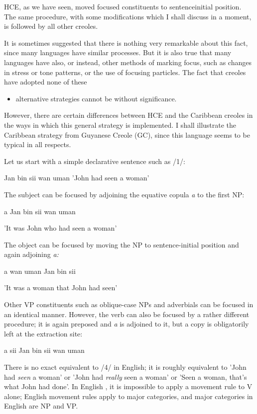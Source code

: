 HCE, as we have seen, moved focused constituents to sentence\-initial position. The same procedure, with some modifications which I shall discuss in a moment, is followed by all other creoles.

It is sometimes suggested that there is nothing very remarkable about this fact, since many languages have similar processes. But it is also true that many languages have also, or instead, other methods of marking focus, such as changes in stress or tone patterns, or the use of focusing particles. The fact that creoles have adopted none of these

\begin{itemize}
\item alternative strategies cannot be without significance.
\end{itemize}

However, there are certain differences between HCE and the Caribbean creoles in the ways in which this general strategy is imple\-mented. I shall illustrate the Caribbean strategy from Guyanese Creole (GC), since this language seems to be typical in all respects.

Let us start with a simple declarative sentence such as /1/:

\ea\label{ex:1}
 Jan bin sii wan uman 'John had seen a woman'
\glt
\z

The subject can be focused by adjoining the equative copula \textit{a} to the first NP:

\ea\label{ex:2}
 a Jan bin sii wan uman
\glt
\z

'It was John who had seen a woman'

The object can be focused by moving the NP to sentence-initial position and again adjoining \textit{a:}

\ea\label{ex:3}
 a wan uman Jan bin sii
\glt
\z

'It was a woman that John had seen'

Other VP constituents such as oblique-case NPs and adverbials can be focused in an identical manner. However, the verb can also be focused by a rather different procedure; it is again preposed and \textit{a} is adjoined to it, but a copy is obligatorily left at the extraction site:

\ea\label{ex:4}
 a sii Jan bin sii wan uman
\glt
\z

There is no exact equivalent to /4/ in English; it is roughly equivalent to 'John had \textit{seen} a woman' or 'John had \textit{really }seen a woman' or 'Seen a woman, that's what John had done'. In English , it is impossible to apply a movement rule to V alone; English movement rules apply to major categories, and major categories in English are NP and VP.

